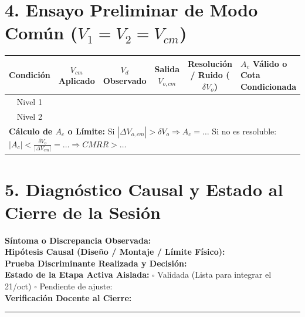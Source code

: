 \documentclass[10pt, a4paper]{article}
\begin{document}
\section*{4. Ensayo Preliminar de Modo Común ($V_1 = V_2 = V_{cm}$)}
\begin{table}[htbp]
    \centering
    \footnotesize
    \renewcommand{\arraystretch}{1.4}
    \begin{tabularx}{\textwidth}{|c|c|c|c|c|>{\raggedright\arraybackslash}X|}
    \hline
    \rowcolor[HTML]{EFEFEF} 
    \textbf{Condición} & \textbf{$V_{cm}$ Aplicado} & \textbf{$V_d$ Observado} & \textbf{Salida $V_{o,cm}$} & \textbf{Resolución / Ruido ($\delta V_o$)} & \textbf{$A_c$ Válido o Cota Condicionada} \\ \hline
    Nivel 1 & & & & & \\ \hline
    Nivel 2 & & & & & \\ \hline
    \multicolumn{6}{|l|}{\textbf{Cálculo de $A_c$ o Límite:} Si $|\Delta V_{o,cm}| > \delta V_o \Rightarrow A_c = \dots$ \quad Si no es resoluble: $|A_c| < \frac{\delta V_o}{|\Delta V_{cm}|} = \dots \Rightarrow CMRR > \dots$} \\ \hline
    \end{tabularx}
\end{table}

\section*{5. Diagnóstico Causal y Estado al Cierre de la Sesión}
\begin{tcolorbox}[colback=white, colframe=black]
    \textbf{Síntoma o Discrepancia Observada:} \hrulefill \\[0.15cm]
    \textbf{Hipótesis Causal (Diseño / Montaje / Límite Físico):} \hrulefill \\[0.15cm]
    \textbf{Prueba Discriminante Realizada y Decisión:} \hrulefill \\[0.15cm]
    \textbf{Estado de la Etapa Activa Aislada:} $\square$ Validada (Lista para integrar el 21/oct) \quad $\square$ Pendiente de ajuste: \hrulefill \\[0.15cm]
    \textbf{Verificación Docente al Cierre:} \rule{5cm}{0.4pt}
\end{tcolorbox}
\end{document}
